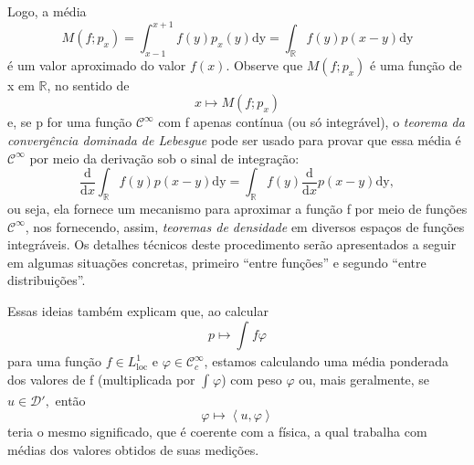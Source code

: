 \documentclass[../distribution_theory_notes.tex]{subfiles}
\begin{document}
Logo, a média
\[
	M(f; p_{x})= \int_{x-1}^{x+1}f(y)p_{x}(y) \mathrm{dy}=\int_{\mathbb{R}}^{}f(y)p(x-y) \mathrm{dy}
\]
é um valor aproximado do valor \(f(x).\) Observe que \(M(f; p_x)\) é uma função de x em \(\mathbb{R}\), no sentido de
\[
	x\mapsto M(f; p_x)
\]
e, se p for uma função \(\mathcal{C}^{\infty}\) com f apenas contínua (ou só integrável), o \textit{teorema da convergência dominada de Lebesgue} pode ser usado para provar que essa média é \(\mathcal{C}^{\infty}\) por meio da derivação sob o sinal de integração:
\[
	\frac{\mathrm{d}}{\mathrm{d}x} \int_{\mathbb{R}}^{}f(y)p(x-y) \mathrm{dy}=\int_{\mathbb{R}}^{}f(y) \frac{\mathrm{d}}{\mathrm{d}x}p(x-y) \mathrm{dy},
\]
ou seja, ela fornece um mecanismo para aproximar a função f por meio de funções \(\mathcal{C}^{\infty}\), nos fornecendo, assim, \textit{teoremas de densidade} em diversos espaços de funções integráveis. Os detalhes técnicos deste procedimento serão apresentados a seguir em algumas situações concretas, primeiro ``entre funções'' e segundo ``entre distribuições''.

Essas ideias também explicam que, ao calcular
\[
	p\mapsto \int_{}^{}f \varphi
\]
para uma função \(f\in L_{\mathrm{loc}}^{1}\) e \(\varphi \in \mathcal{C}_{c}^{\infty}\), estamos calculando uma média ponderada dos valores de f (multiplicada por \(\int_{}^{}\varphi \)) com peso \(\varphi \) ou, mais geralmente, se \(u\in \mathcal{D}',\) então
\[
	\varphi \mapsto \left< u, \varphi  \right>
\]
teria o mesmo significado, que é coerente com a física, a qual trabalha com médias dos valores obtidos de suas medições.
\end{document}
